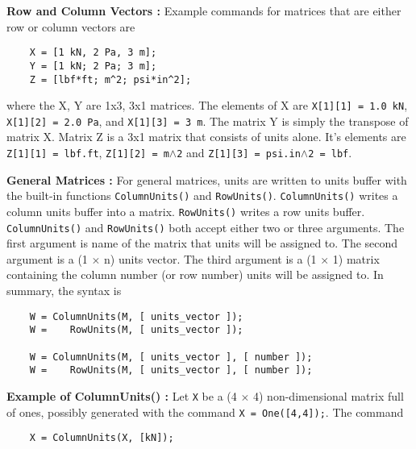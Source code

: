 \vspace{0.15 in}\noindent
{\bf Row and Column Vectors :}
Example commands for matrices that
are either row or column vectors are

\begin{footnotesize}
\begin{verbatim}
    X = [1 kN, 2 Pa, 3 m];
    Y = [1 kN; 2 Pa; 3 m];
    Z = [lbf*ft; m^2; psi*in^2];
\end{verbatim}
\end{footnotesize}

\vspace{0.15 in}\noindent
where the X, Y are 1x3, 3x1 matrices.
The elements of X are {\tt X[1][1] = 1.0 kN},
{\tt X[1][2] = 2.0 Pa}, and {\tt X[1][3] = 3 m}.
The matrix Y is simply the transpose of matrix X.
Matrix Z is a 3x1 matrix that consists of units alone.
It's elements are {\tt Z[1][1] = lbf.ft},
{\tt Z[1][2] = m$\wedge$2} and {\tt Z[1][3] = psi.in$\wedge$2 = lbf}.

\vspace{0.15 in}\noindent
{\bf General Matrices :}
For general matrices, units are written to units buffer with the
built-in functions {\tt ColumnUnits()} and {\tt RowUnits()}.
{\tt ColumnUnits()} writes a column units buffer into a matrix.
{\tt RowUnits()} writes a row units buffer.
{\tt ColumnUnits()} and {\tt RowUnits()}
both accept either two or three arguments.
The first argument is name of the matrix that units will be assigned to.
The second argument is a (1 $\times$ n) units vector.
The third argument is a (1 $\times$ 1) matrix
containing the column number (or row number) units will be assigned to.
In summary, the syntax is

\begin{footnotesize}
\begin{verbatim}
    W = ColumnUnits(M, [ units_vector ]);
    W =    RowUnits(M, [ units_vector ]);

    W = ColumnUnits(M, [ units_vector ], [ number ]);
    W =    RowUnits(M, [ units_vector ], [ number ]);
\end{verbatim}
\end{footnotesize}

\vspace{0.15 in}\noindent
{\bf Example of ColumnUnits() :}
Let {\tt X} be a (4 $\times$ 4) non-dimensional matrix full of ones,
possibly generated with the command {\tt X = One([4,4]);}.
The command

\begin{footnotesize}

\begin{verbatim}
    X = ColumnUnits(X, [kN]);
\end{verbatim}
\end{footnotesize}

